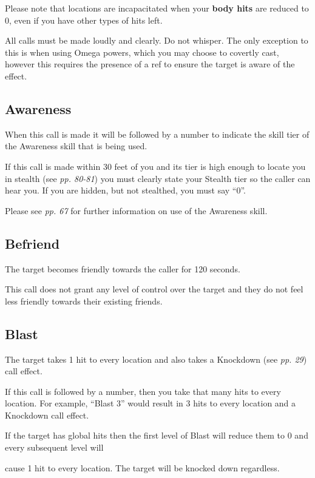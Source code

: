\documentclass{scrbook}
\begin{document}
Please note that locations are incapacitated when your \textbf{body hits} are reduced to 0, even if you have other types of hits left.

All calls must be made loudly and clearly. Do not whisper. The only exception to this is when using Omega powers, which you may choose to covertly cast, however this requires the presence of a ref to ensure the target is aware of the effect.

\subsection{Awareness}

When this call is made it will be followed by a number to indicate the skill tier of the Awareness skill that is being used.

If this call is made within 30 feet of you and its tier is high enough to locate you in stealth (see \textit{pp. 80-81}) you must clearly state your Stealth tier so the caller can hear you. If you are hidden, but not stealthed, you must say ``0''.

Please see \textit{pp. 67} for further information on use of the Awareness skill.

\subsection{Befriend}

The target becomes friendly towards the caller for 120 seconds.

This call does not grant any level of control over the target and they do not feel less friendly towards their existing friends.

\subsection{Blast}

The target takes 1 hit to every location and also takes a Knockdown (see \textit{pp. 29}) call effect.

If this call is followed by a number, then you take that many hits to every location. For example, ``Blast 3'' would result in 3 hits to every location and a Knockdown call effect.

If the target has global hits then the first level of Blast will reduce them to 0 and every subsequent level will

cause 1 hit to every location. The target will be knocked down regardless.
\end{document}
